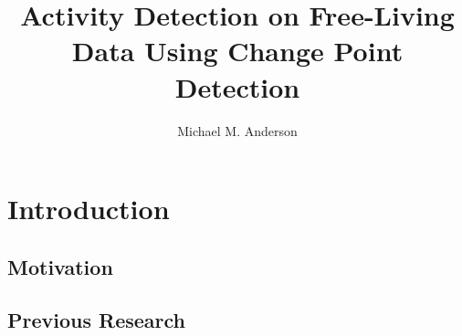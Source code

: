 \documentclass[onehalf,11pt]{beavtex}
\title{Activity Detection on Free-Living Data Using Change Point Detection}
\author{Michael M. Anderson}
\begin{document}
\maketitle
\mainmatter


\chapter{Introduction}
\section{Motivation}
\section{Previous Research}









%
\end{document}
